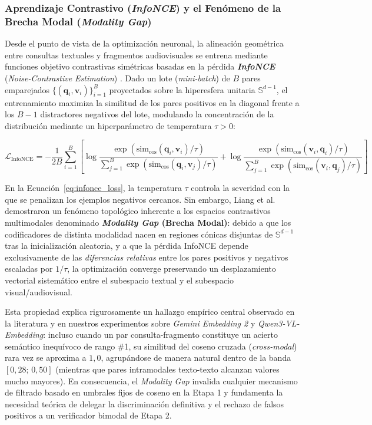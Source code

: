 \subsubsection{Aprendizaje Contrastivo (\textit{InfoNCE}) y el Fenómeno de la Brecha Modal (\textit{Modality Gap})}
\label{subsubsec:infonce_modality_gap}

Desde el punto de vista de la optimización neuronal, la alineación geométrica entre consultas textuales y fragmentos audiovisuales se entrena mediante funciones objetivo contrastivas simétricas basadas en la pérdida \textbf{\textit{InfoNCE}} (\textit{Noise-Contrastive Estimation}) \cite{vandenoord2018cpc, radford2021clip}. Dado un lote (\textit{mini-batch}) de $B$ pares emparejados $\{(\mathbf{q}_i, \mathbf{v}_i)\}_{i=1}^{B}$ proyectados sobre la hiperesfera unitaria $\mathbb{S}^{d-1}$, el entrenamiento maximiza la similitud de los pares positivos en la diagonal frente a los $B-1$ distractores negativos del lote, modulando la concentración de la distribución mediante un hiperparámetro de temperatura $\tau > 0$:

\begin{equation}
\mathcal{L}_{\text{InfoNCE}} = -\frac{1}{2B} \sum_{i=1}^{B} \left[
\log \frac{\exp\!\left(\text{sim}_{\cos}(\mathbf{q}_i, \mathbf{v}_i) / \tau\right)}{\sum_{j=1}^{B} \exp\!\left(\text{sim}_{\cos}(\mathbf{q}_i, \mathbf{v}_j) / \tau\right)} +
\log \frac{\exp\!\left(\text{sim}_{\cos}(\mathbf{v}_i, \mathbf{q}_i) / \tau\right)}{\sum_{j=1}^{B} \exp\!\left(\text{sim}_{\cos}(\mathbf{v}_i, \mathbf{q}_j) / \tau\right)}
\right]
\label{eq:infonce_loss}
\end{equation}

En la Ecuación~\eqref{eq:infonce_loss}, la temperatura $\tau$ controla la severidad con la que se penalizan los ejemplos negativos cercanos. Sin embargo, Liang et al. \cite{liang2022modalitygap} demostraron un fenómeno topológico inherente a los espacios contrastivos multimodales denominado \textbf{\textit{Modality Gap} (Brecha Modal)}: debido a que los codificadores de distinta modalidad nacen en regiones cónicas disjuntas de $\mathbb{S}^{d-1}$ tras la inicialización aleatoria, y a que la pérdida InfoNCE depende exclusivamente de las \textit{diferencias relativas} entre los pares positivos y negativos escaladas por $1/\tau$, la optimización converge preservando un desplazamiento vectorial sistemático entre el subespacio textual y el subespacio visual/audiovisual.

Esta propiedad explica rigurosamente un hallazgo empírico central observado en la literatura y en nuestros experimentos sobre \textit{Gemini Embedding 2} y \textit{Qwen3-VL-Embedding}: incluso cuando un par consulta-fragmento constituye un acierto semántico inequívoco de rango \#1, su similitud del coseno cruzada (\textit{cross-modal}) rara vez se aproxima a $1,0$, agrupándose de manera natural dentro de la banda $[0{,}28;\, 0{,}50]$ (mientras que pares intramodales texto-texto alcanzan valores mucho mayores). En consecuencia, el \textit{Modality Gap} invalida cualquier mecanismo de filtrado basado en umbrales fijos de coseno en la Etapa 1 y fundamenta la necesidad teórica de delegar la discriminación definitiva y el rechazo de falsos positivos a un verificador bimodal de Etapa 2.